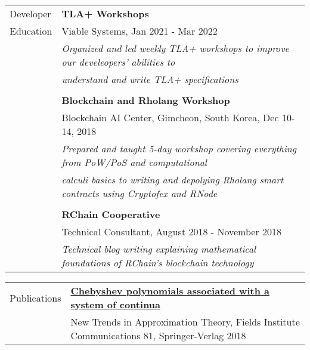 \documentclass[letterpaper,10pt,oneside]{article}
\begin{document}
\vfill


\noindent \begin{tabular}{@{} l l}
 \Large{Developer} & \textbf{TLA+ Workshops} \\
 \Large{Education} & Viable Systems, Jan 2021 - Mar 2022 \\
 \hspace{1.1in} & \emph{Organized and led weekly TLA+ workshops to improve our develeopers' abilities to} \\
 & \emph{understand and write TLA+ specifications} \\
 & \\
 & \textbf{Blockchain and Rholang Workshop} \\
 & Blockchain AI Center, Gimcheon, South Korea, Dec 10-14, 2018 \\
 & \emph{Prepared and taught 5-day workshop covering everything from PoW/PoS and computational} \\
 & \emph{calculi basics to writing and depolying Rholang smart contracts using Cryptofex and RNode} \\
 & \\
 &  \textbf{RChain Cooperative} \\
 & Technical Consultant, August 2018 - November 2018 \\
 & \emph{Technical blog writing explaining mathematical foundations of RChain's blockchain technology} \\
\end{tabular}

\vfill


\noindent \begin{tabular}{@{} l l}
 \Large{Publications} & \href{https://link.springer.com/chapter/10.1007/978-1-4939-7543-3_7}{\textbf{Chebyshev polynomials associated with a system of continua}} \\
 \hspace{1.1in} & New Trends in Approximation Theory, Fields Institute Communications 81, Springer-Verlag 2018 \\
\end{tabular}

\vfill

\end{document}
